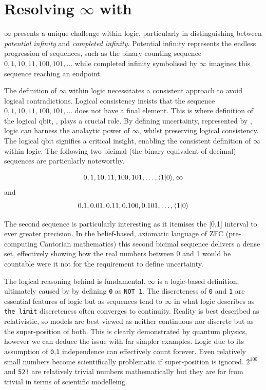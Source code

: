 \documentclass[12pt]{article}
\begin{document}
\section*{Resolving $\infty$ with \qbit{}}

$\infty$ presents a unique challenge within logic, particularly in distinguishing between \textit{potential infinity} and \textit{completed infinity}. Potential infinity represents the endless progression of sequences, such as the binary counting sequence $0, 1, 10, 11, 100, 101, \ldots$ while completed infinity symbolised by $\infty$ imagines this sequence reaching an endpoint.

The definition of $\infty$ within logic necessitates a consistent approach to avoid logical contradictions. Logical consistency insists that the sequence $0, 1, 10, 11, 100, 101, \ldots$ does not have a final element. This is where definition of the logical qbit, \qbit{}, plays a crucial role. By defining uncertainty, represented by \qbit{}, logic can harness the analaytic power of $\infty$, whilst preserving logical consistency. The logical qbit signifies a critical insight, enabling the consistent definition of $\infty$ within logic. The following two bicimal (the binary equivalent of decimal) sequences are particularly noteworthy.

\begin{equation}
    0, 1, 10, 11, 100, 101, \ldots, \langle 1 | 0 \rangle{}, \infty
\end{equation}
and
\begin{equation}
    0.1, 0.01, 0.11, 0.100, 0.101, \ldots, \langle 1 | 0 \rangle{}
\end{equation}

The second sequence is particularly interesting as it itemises the [0,1] interval to ever greater precision. In the belief-based, axiomatic language of ZFC (pre-computing Cantorian mathematics) this second bicimal sequence delivers a dense set, effectively showing how the real numbers between 0 and 1 would be countable were it not for the requirement to define \qbit{} uncertainty.

The logical reasoning behind \qbit{} is fundamental. $\infty$ is a logic-based definition, ultimately caused by by defining \texttt{0} as \texttt{NOT 1}. The discreteness of \texttt{0} and \texttt{1} are essential features of logic but as sequences tend to $\infty$ in what logic describes as \texttt{the limit} discreteness often converges to continuity. Reality is best described as relativistic, so models are best viewed as neither continuous nor discrete but as the super-position of both. This is clearly demonstrated by quantum physics, however we can deduce the issue with far simpler examples. Logic due to its assumption of \texttt{0},\texttt{1} independence can effectively count forever. Even relatively small numbers become scientifically problematic if \qbit{} super-position is ignored. $2^{100}$ and \texttt{52!} are relatively trivial numbers mathematically but they are far from trivial in terms of scientific modelleing.
\end{document}
